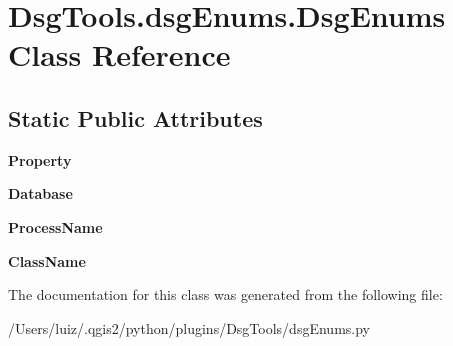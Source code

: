 \hypertarget{class_dsg_tools_1_1dsg_enums_1_1_dsg_enums}{}\section{Dsg\+Tools.\+dsg\+Enums.\+Dsg\+Enums Class Reference}
\label{class_dsg_tools_1_1dsg_enums_1_1_dsg_enums}
\subsection*{Static Public Attributes}
\begin{DoxyCompactItemize}
\item 
\mbox{\label{class_dsg_tools_1_1dsg_enums_1_1_dsg_enums_abbe178209d158b0866d46c7ca63d5dd7}} 
{\bfseries Property}
\item 
\mbox{\label{class_dsg_tools_1_1dsg_enums_1_1_dsg_enums_a5c2c26d9eb45068d3a70b2d6d6367335}} 
{\bfseries Database}
\item 
\mbox{\label{class_dsg_tools_1_1dsg_enums_1_1_dsg_enums_a05bb1bbd77d8d7291a31d7e58da18313}} 
{\bfseries Process\+Name}
\item 
\mbox{\label{class_dsg_tools_1_1dsg_enums_1_1_dsg_enums_a9be3995f4e5c29b1c9446939236bf663}} 
{\bfseries Class\+Name}
\end{DoxyCompactItemize}


The documentation for this class was generated from the following file\+:\begin{DoxyCompactItemize}
\item 
/\+Users/luiz/.\+qgis2/python/plugins/\+Dsg\+Tools/dsg\+Enums.\+py\end{DoxyCompactItemize}
